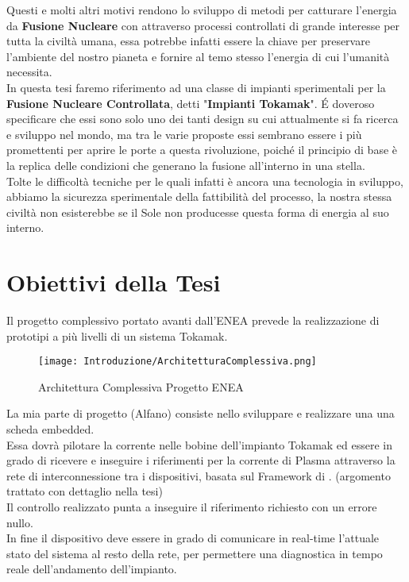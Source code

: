 \noindent
Questi e molti altri motivi rendono lo sviluppo di metodi per catturare l'energia da \textbf{Fusione Nucleare} con attraverso processi controllati di grande interesse per tutta la civiltà umana, essa potrebbe infatti essere la chiave per preservare l'ambiente del nostro pianeta e fornire al temo stesso l'energia di cui l'umanità necessita.\\
In questa tesi faremo riferimento ad una classe di impianti sperimentali per la \textbf{Fusione Nucleare Controllata}, detti "\textbf{Impianti Tokamak}". \'E doveroso specificare che essi sono solo uno dei tanti design su cui attualmente si fa ricerca e sviluppo nel mondo, ma tra le varie proposte essi sembrano essere i più promettenti per aprire le porte a questa rivoluzione, poiché il principio di base è la replica delle condizioni che generano la fusione all'interno in una stella.\\
Tolte le difficoltà tecniche per le quali infatti è ancora una tecnologia in sviluppo, abbiamo la sicurezza sperimentale della fattibilità del processo, la nostra stessa civiltà non esisterebbe se il Sole non producesse questa forma di energia al suo interno.
\newpage


\section*{Obiettivi della Tesi}
Il progetto complessivo portato avanti dall'ENEA prevede la realizzazione di prototipi a più livelli di un sistema Tokamak.\vspace{-4mm}
\begin{figure}[H]
	\centering
	\caption[Architettura Complessiva Progetto ENEA]{Architettura Complessiva Progetto ENEA}
	\texttt{[image: Introduzione/ArchitetturaComplessiva.png]}
\end{figure}\vspace{-8mm}
\noindent
La mia parte di progetto ({\color{red}Alfano}) consiste nello sviluppare e realizzare una una scheda embedded.\\
Essa dovrà pilotare la corrente nelle bobine dell'impianto Tokamak ed essere in grado di ricevere e inseguire i riferimenti per la corrente di Plasma attraverso la rete di interconnessione tra i dispositivi, basata sul Framework di \MARTe. (argomento trattato con dettaglio nella tesi)\\
Il controllo realizzato punta a inseguire il riferimento richiesto con un errore nullo.\\
In fine il dispositivo deve essere in grado di comunicare in real-time l'attuale stato del sistema al resto della rete, per permettere una diagnostica in tempo reale dell'andamento dell'impianto.\\